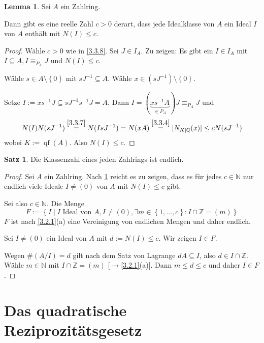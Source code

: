 \documentclass[
twoside=semi,
fontsize=12,
DIV=12, 
cleardoublepage=current,
leqno,
headings=optiontoheadandtoc, 
toc=idx
]{scrbook}
\newcommand{\N}{\mathbb{N}}
\newcommand{\Z}{\mathbb{Z}}
\newcommand{\Q}{\mathbb{Q}}
\newcommand{\set}[1]{\left\{ #1 \right\}}
\DeclareMathOperator{\qf}{qf}
\theoremstyle{definition}
\newtheorem{satz}[definition]{Satz}
\newtheorem{lemma}[definition]{Lemma}
\begin{document}
 	\begin{lemma}\label{3.3.10}\hfill\newline
 		Sei $A$ ein Zahlring.
 		
 		\medskip\noindent
 		Dann gibt es eine reelle Zahl $c > 0$ derart, dass jede Idealklasse von $A$ ein Ideal $I$ von $A$ enth\"alt mit $N(I) \leq c$.
 		
 		\begin{proof}
 			W\"ahle $c > 0$ wie in \ref{3.3.8}. Sei $J \in I_A$. Zu zeigen: Es gibt ein $I \in I_A$ mit $I \subseteq A, I \equiv_{P_A} J$ und $N(I) \leq c$.
 			
 			W\"ahle $s \in A \setminus \set{0}$ mit $sJ^{-1} \subseteq A$. W\"ahle $x \in (sJ^{-1})\setminus \set{0}$. 
 			
 			\noindent Setze $I:= xs^{-1}J \subseteq sJ^{-1}s^{-1}J = A$. Dann $I = (\underbrace{xs^{-1}A}_{\in P_A})J \equiv_{P_A} J$ und 
 				\[N(I)N(sJ^{-1}) \overset{\ref{3.3.7}}{=} N(IsJ^{-1}) =N(xA) \overset{\ref{3.3.4}}{=} |N_{K|\Q}(x)| \leq cN(sJ^{-1})\]
 			wobei $K:= \qf(A)$. Also $N(I) \leq c$.
 		\end{proof}
 	\end{lemma}
 
	\begin{satz}\label{3.3.11}\hfill\newline
		Die Klassenzahl eines jeden Zahlrings ist endlich.
		
		\begin{proof}
			Sei $A$ ein Zahlring. Nach \ref{3.3.10} reicht es zu zeigen, dass es f\"ur jedes $c \in \N$ nur endlich viele Ideale $I \neq (0)$ von $A$ mit $N(I) \leq c$ gibt.
			
			Sei also $c \in \N$. Die Menge 
				\[F:= \set{I\mid I \textrm{ Ideal von } A, I \neq (0), \exists m \in \set{1, \dots, c}: I \cap \Z = (m)}\]
			$F$ ist nach \ref{3.2.1}(a) eine Vereinigung von endlichen Mengen und daher endlich.
			
			Sei $I \neq(0)$ ein Ideal von $A$ mit $d:= N(I) \leq c$. Wir zeigen $I \in F$.
			
			Wegen $\#(A/I) = d$ gilt nach dem Satz von Lagrange $dA \subseteq I$, also $d \in I \cap \Z$.
			W\"ahle $m \in \N$ mit $I \cap \Z = (m)$ [$\to$\ref{3.2.1}(a)]. Dann $m \leq d \leq c$ und daher $I \in F$. 
		\end{proof}
	\end{satz} 

 	\newpage
 	\chapter[tocentry={Das quadratische Reziprozit\"atsgesetz}]{Das quadratische Reziprozit\"atsgesetz}
\end{document}
